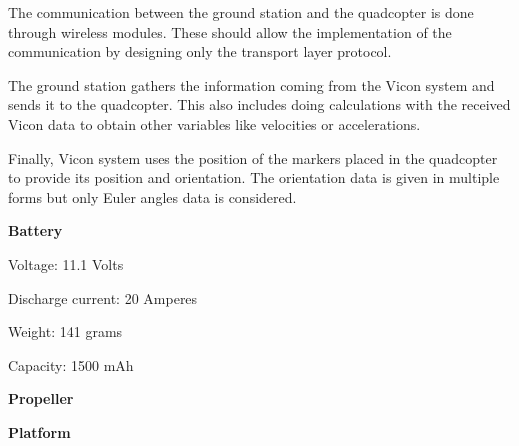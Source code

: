 The communication between the ground station and the quadcopter is done through wireless modules. These should allow the implementation of the communication by designing only the transport layer protocol.

The ground station gathers the information coming from the Vicon system and sends it to the quadcopter. This also includes doing calculations with the received Vicon data to obtain other variables like velocities or accelerations.

Finally, Vicon system uses the position of the markers placed in the quadcopter to provide its position and orientation. The orientation data is given in multiple forms but only Euler angles data is considered.

\textbf{Battery}

Voltage: 11.1 Volts

Discharge current: 20 Amperes

Weight: 141 grams

Capacity: 1500 mAh

\textbf{Propeller}



\textbf{Platform}

